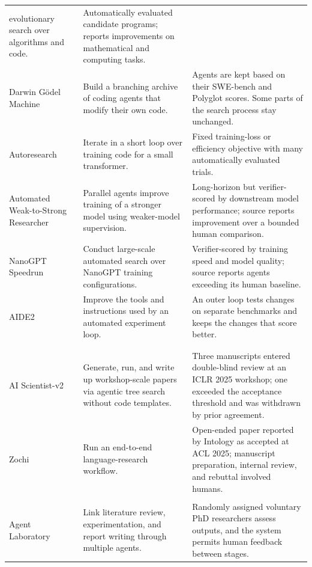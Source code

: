 \documentclass[]{crux} %
\begin{document}
{\begin{longtable}{@{}P{0.21\textwidth}P{0.30\textwidth}P{0.39\textwidth}@{}}
evolutionary search over algorithms and code. & Automatically evaluated
candidate programs; reports improvements on mathematical and computing tasks. \\
Darwin G\"odel Machine~\citep{darwingodel} & Build a branching archive of
coding agents that modify their own code. & Agents are kept based on their
SWE-bench and Polyglot scores. Some parts of the search process stay unchanged. \\
Autoresearch~\citep{autoresearch} & Iterate in a short loop over training code
for a small transformer. & Fixed training-loss or efficiency objective with
many automatically evaluated trials. \\
Automated Weak-to-Strong Researcher~\citep{weakstrongresearcher} & Parallel
agents improve training of a stronger model using weaker-model supervision. &
Long-horizon but verifier-scored by downstream model performance; source
reports improvement over a bounded human comparison. \\
NanoGPT Speedrun~\citep{nanogptspeedrun} & Conduct large-scale automated search
over NanoGPT training configurations. & Verifier-scored by training speed and
model quality; source reports agents exceeding its human baseline. \\
AIDE2~\citep{aide2} & Improve the tools and instructions used by an automated
experiment loop. & An outer loop tests changes on separate benchmarks and
keeps the changes that score better. \\
\addlinespace[4pt]
 \\
\addlinespace[3pt]
 \\
\addlinespace[2pt]
AI Scientist-v2~\citep{aiscientist2} & Generate, run, and write up
workshop-scale papers via agentic tree search without code templates. & Three
manuscripts entered double-blind review at an ICLR 2025 workshop; one exceeded
the acceptance threshold and was withdrawn by prior agreement. \\
Zochi~\citep{zochi,tempest} & Run an end-to-end language-research workflow. &
Open-ended paper reported by Intology as accepted at ACL 2025; manuscript
preparation, internal review, and rebuttal involved humans. \\
\addlinespace[4pt]
 \\
\addlinespace[2pt]
Agent Laboratory~\citep{agentlaboratory} & Link literature review,
experimentation, and report writing through multiple agents. & Randomly assigned voluntary PhD researchers assess outputs, and the system permits human feedback between stages. \\
\end{longtable}
\par}
\end{document}
